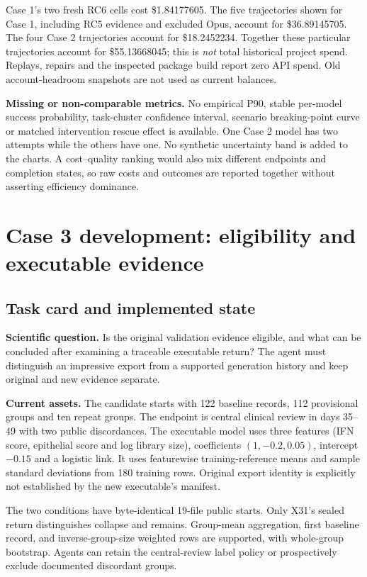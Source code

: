 \documentclass[11pt,a4paper]{article}
\begin{document}
Case 1's two fresh RC6 cells cost \$1.84177605. The five trajectories shown for Case 1, including RC5 evidence and excluded Opus, account for \$36.89145705. The four Case 2 trajectories account for \$18.2452234. Together these particular trajectories account for \$55.13668045; this is \emph{not} total historical project spend. Replays, repairs and the inspected package build report zero API spend. Old account-headroom snapshots are not used as current balances.

\textbf{Missing or non-comparable metrics.} No empirical P90, stable per-model success probability, task-cluster confidence interval, scenario breaking-point curve or matched intervention rescue effect is available. One Case 2 model has two attempts while the others have one. No synthetic uncertainty band is added to the charts. A cost--quality ranking would also mix different endpoints and completion states, so raw costs and outcomes are reported together without asserting efficiency dominance.

\section{Case 3 development: eligibility and executable evidence}
\subsection{Task card and implemented state}

\textbf{Scientific question.} Is the original validation evidence eligible, and what can be concluded after examining a traceable executable return? The agent must distinguish an impressive export from a supported generation history and keep original and new evidence separate.

\textbf{Current assets.} The candidate starts with 122 baseline records, 112 provisional groups and ten repeat groups. The endpoint is central clinical review in days 35--49 with two public discordances. The executable model uses three features (IFN score, epithelial score and log library size), coefficients $(1,-0.2,0.05)$, intercept $-0.15$ and a logistic link. It uses featurewise training-reference means and sample standard deviations from 180 training rows. Original export identity is explicitly not established by the new executable's manifest.\cite{c3}

The two conditions have byte-identical 19-file public starts. Only X31's sealed return distinguishes collapse and remains. Group-mean aggregation, first baseline record, and inverse-group-size weighted rows are supported, with whole-group bootstrap. Agents can retain the central-review label policy or prospectively exclude documented discordant groups.
\end{document}
